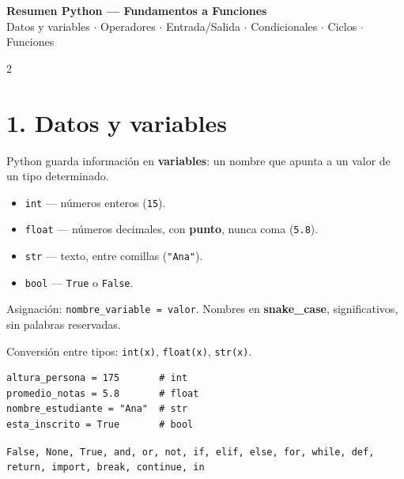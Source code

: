 \documentclass[10pt]{article}
\begin{document}
\begin{center}
\Large\textbf{Resumen Python --- Fundamentos a Funciones}\\[0.5mm]
\footnotesize Datos y variables $\cdot$ Operadores $\cdot$ Entrada/Salida $\cdot$ Condicionales $\cdot$ Ciclos $\cdot$ Funciones
\end{center}

\vspace{2mm}

\begin{multicols}{2}

\section*{1. Datos y variables}

Python guarda información en \textbf{variables}: un nombre que apunta a un valor de un tipo determinado.

\begin{itemize}
  \item \texttt{int} --- números enteros (\texttt{15}).
  \item \texttt{float} --- números decimales, con \textbf{punto}, nunca coma (\texttt{5.8}).
  \item \texttt{str} --- texto, entre comillas (\texttt{"Ana"}).
  \item \texttt{bool} --- \texttt{True} o \texttt{False}.
\end{itemize}

Asignación: \texttt{nombre\_variable = valor}. Nombres en \textbf{snake\_case}, significativos, sin palabras reservadas.

Conversión entre tipos: \texttt{int(x)}, \texttt{float(x)}, \texttt{str(x)}.

\begin{cajacodigo}
\begin{Verbatim}[fontsize=\footnotesize]
altura_persona = 175       # int
promedio_notas = 5.8       # float
nombre_estudiante = "Ana"  # str
esta_inscrito = True       # bool
\end{Verbatim}
\end{cajacodigo}

\begin{formulabox}
\footnotesize
\texttt{False, None, True, and, or, not, if, elif, else, for, while, def, return, import, break, continue, in}
\end{formulabox}


\end{multicols}
\end{document}
